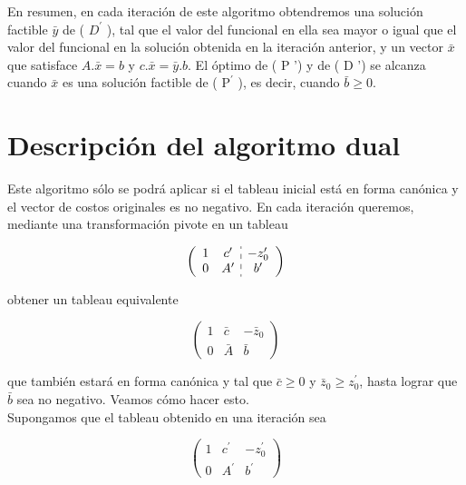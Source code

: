 \documentclass[10pt]{article}
\begin{document}
En resumen, en cada iteración de este algoritmo obtendremos una solución factible $\bar{y}$ de ( $D^{\prime}$ ), tal que el valor del funcional en ella sea mayor o igual que el valor del funcional en la solución obtenida en la iteración anterior, y un vector $\bar{x}$ que satisface $A . \bar{x}=b$ y $c . \bar{x}=\bar{y} . b$. El óptimo de ( P ') y de ( D ') se alcanza cuando $\bar{x}$ es una solución factible de ( $\mathrm{P}^{\prime}$ ), es decir, cuando $\bar{b} \geq 0$.

\section*{Descripción del algoritmo dual}
Este algoritmo sólo se podrá aplicar si el tableau inicial está en forma canónica y el vector de costos originales es no negativo. En cada iteración queremos, mediante una transformación pivote en un tableau

$$
\left(\begin{array}{cc:c}
1 & c^{\prime} & -z_{0}^{\prime} \\
0 & A^{\prime} & b^{\prime}
\end{array}\right)
$$

obtener un tableau equivalente

$$
\left(\begin{array}{cc|c}
1 & \bar{c} & -\bar{z}_{0} \\
0 & \bar{A} & \bar{b}
\end{array}\right)
$$

que también estará en forma canónica y tal que $\bar{c} \geq 0$ y $\bar{z}_{0} \geq z_{0}^{\prime}$, hasta lograr que $\bar{b}$ sea no negativo. Veamos cómo hacer esto.\\
Supongamos que el tableau obtenido en una iteración sea

$$
\left(\begin{array}{cc|c}
1 & c^{\prime} & -z_{0}^{\prime} \\
0 & A^{\prime} & b^{\prime}
\end{array}\right)
$$
\end{document}
